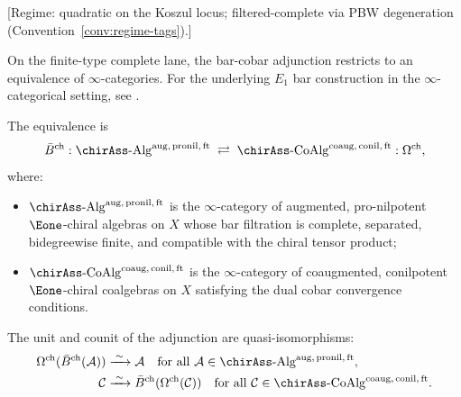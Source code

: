 \begin{theorem}
\label{thm:e1-chiral-koszul-duality}
\textup{[Regime: quadratic on the Koszul locus;
filtered-complete via PBW degeneration
\textup{(}Convention~\textup{\ref{conv:regime-tags})}.]}

On the finite-type complete lane, the bar-cobar adjunction restricts to
an equivalence of $\infty$-categories. For the underlying $E_1$ bar
construction in the $\infty$-categorical setting, see
\cite[§5.2.2]{HA}.

The equivalence
is
\[
\bar{B}^{\mathrm{ch}}:
\chirAss\text{-}\mathrm{Alg}^{\mathrm{aug,\, pronil,\, ft}}
\;\rightleftarrows\;
\chirAss\text{-}\mathrm{CoAlg}^{\mathrm{coaug,\, conil,\, ft}}
:\Omega^{\mathrm{ch}},
\]
where:
\begin{itemize}
\item $\chirAss\text{-}\mathrm{Alg}^{\mathrm{aug,\, pronil,\, ft}}$
 is the $\infty$-category of augmented, pro-nilpotent
 $\Eone$-chiral algebras on $X$ whose bar filtration is complete,
 separated, bidegreewise finite, and compatible with the chiral tensor
 product;
\item $\chirAss\text{-}\mathrm{CoAlg}^{\mathrm{coaug,\, conil,\, ft}}$
 is the $\infty$-category of coaugmented, conilpotent
 $\Eone$-chiral coalgebras on $X$ satisfying the dual cobar
 convergence conditions.
\end{itemize}

The unit and counit of the adjunction are quasi-isomorphisms:
\begin{align}
\Omega^{\mathrm{ch}}(\bar{B}^{\mathrm{ch}}(\mathcal{A}))
&\xrightarrow{\;\sim\;} \mathcal{A}
\quad \text{for all } \mathcal{A} \in
\chirAss\text{-}\mathrm{Alg}^{\mathrm{aug,\, pronil,\, ft}},
\label{eq:e1-counit} \\
\mathcal{C}
&\xrightarrow{\;\sim\;}
\bar{B}^{\mathrm{ch}}(\Omega^{\mathrm{ch}}(\mathcal{C}))
\quad \text{for all } \mathcal{C} \in
\chirAss\text{-}\mathrm{CoAlg}^{\mathrm{coaug,\, conil,\, ft}}.
\label{eq:e1-unit}
\end{align}
\end{theorem}

